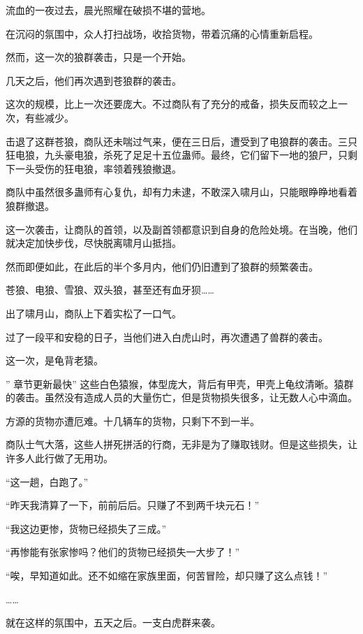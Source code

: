 
\begin{this_body}

流血的一夜过去，晨光照耀在破损不堪的营地。

在沉闷的氛围中，众人打扫战场，收拾货物，带着沉痛的心情重新启程。

然而，这一次的狼群袭击，只是一个开始。

几天之后，他们再次遇到苍狼群的袭击。

这次的规模，比上一次还要庞大。不过商队有了充分的戒备，损失反而较之上一次，有些减少。

击退了这群苍狼，商队还未喘过气来，便在三日后，遭受到了电狼群的袭击。三只狂电狼，九头豪电狼，杀死了足足十五位蛊师。最终，它们留下一地的狼尸，只剩下一头受伤的狂电狼，率领着残狼撤退。

商队中虽然很多蛊师有心复仇，却有力未逮，不敢深入啸月山，只能眼睁睁地看着狼群撤退。

这一次袭击，让商队的首领，以及副首领都意识到自身的危险处境。在当晚，他们就决定加快步伐，尽快脱离啸月山抵挡。

然而即便如此，在此后的半个多月内，他们仍旧遭到了狼群的频繁袭击。

苍狼、电狼、雪狼、双头狼，甚至还有血牙狈……

出了啸月山，商队上下着实松了一口气。

过了一段平和安稳的日子，当他们进入白虎山时，再次遭遇了兽群的袭击。

这一次，是龟背老猿。

” 章节更新最快” 这些白色猿猴，体型庞大，背后有甲壳，甲壳上龟纹清晰。猿群的袭击。虽然没有造成人员的大量伤亡，但是货物损失很多，让无数人心中滴血。

方源的货物亦遭厄难。十几辆车的货物，只剩下不到一半。

商队士气大落，这些人拼死拼活的行商，无非是为了赚取钱财。但是这些损失，让许多人此行做了无用功。

“这一趟，白跑了。”

“昨天我清算了一下，前前后后。只赚了不到两千块元石！”

“我这边更惨，货物已经损失了三成。”

“再惨能有张家惨吗？他们的货物已经损失一大步了！”

“唉，早知道如此。还不如缩在家族里面，何苦冒险，却只赚了这么点钱！”

……

就在这样的氛围中，五天之后。一支白虎群来袭。


\end{this_body}
